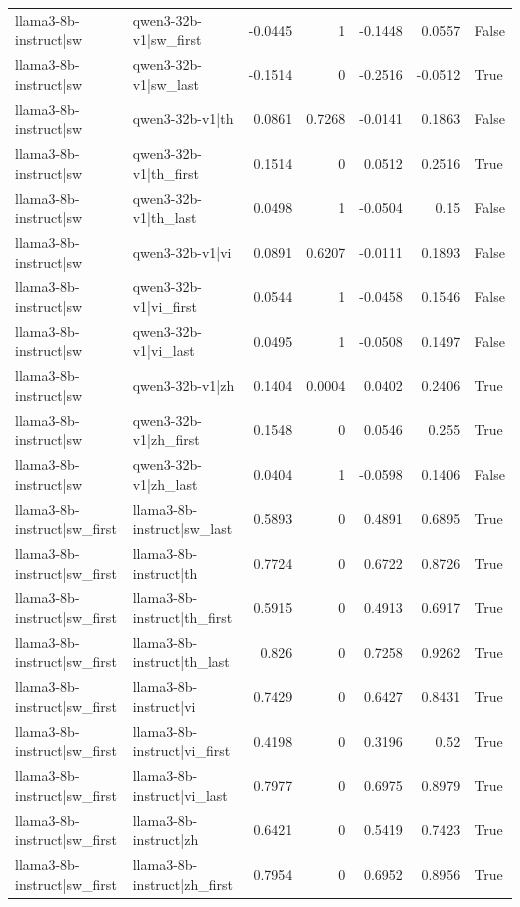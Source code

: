 \begin{table}
\begin{tabular}{l l r r r r l}
llama3-8b-instruct|sw & qwen3-32b-v1|sw_first & -0.0445 & 1 & -0.1448 & 0.0557 & False \\
llama3-8b-instruct|sw & qwen3-32b-v1|sw_last & -0.1514 & 0 & -0.2516 & -0.0512 & True \\
llama3-8b-instruct|sw & qwen3-32b-v1|th & 0.0861 & 0.7268 & -0.0141 & 0.1863 & False \\
llama3-8b-instruct|sw & qwen3-32b-v1|th_first & 0.1514 & 0 & 0.0512 & 0.2516 & True \\
llama3-8b-instruct|sw & qwen3-32b-v1|th_last & 0.0498 & 1 & -0.0504 & 0.15 & False \\
llama3-8b-instruct|sw & qwen3-32b-v1|vi & 0.0891 & 0.6207 & -0.0111 & 0.1893 & False \\
llama3-8b-instruct|sw & qwen3-32b-v1|vi_first & 0.0544 & 1 & -0.0458 & 0.1546 & False \\
llama3-8b-instruct|sw & qwen3-32b-v1|vi_last & 0.0495 & 1 & -0.0508 & 0.1497 & False \\
llama3-8b-instruct|sw & qwen3-32b-v1|zh & 0.1404 & 0.0004 & 0.0402 & 0.2406 & True \\
llama3-8b-instruct|sw & qwen3-32b-v1|zh_first & 0.1548 & 0 & 0.0546 & 0.255 & True \\
llama3-8b-instruct|sw & qwen3-32b-v1|zh_last & 0.0404 & 1 & -0.0598 & 0.1406 & False \\
llama3-8b-instruct|sw_first & llama3-8b-instruct|sw_last & 0.5893 & 0 & 0.4891 & 0.6895 & True \\
llama3-8b-instruct|sw_first & llama3-8b-instruct|th & 0.7724 & 0 & 0.6722 & 0.8726 & True \\
llama3-8b-instruct|sw_first & llama3-8b-instruct|th_first & 0.5915 & 0 & 0.4913 & 0.6917 & True \\
llama3-8b-instruct|sw_first & llama3-8b-instruct|th_last & 0.826 & 0 & 0.7258 & 0.9262 & True \\
llama3-8b-instruct|sw_first & llama3-8b-instruct|vi & 0.7429 & 0 & 0.6427 & 0.8431 & True \\
llama3-8b-instruct|sw_first & llama3-8b-instruct|vi_first & 0.4198 & 0 & 0.3196 & 0.52 & True \\
llama3-8b-instruct|sw_first & llama3-8b-instruct|vi_last & 0.7977 & 0 & 0.6975 & 0.8979 & True \\
llama3-8b-instruct|sw_first & llama3-8b-instruct|zh & 0.6421 & 0 & 0.5419 & 0.7423 & True \\
llama3-8b-instruct|sw_first & llama3-8b-instruct|zh_first & 0.7954 & 0 & 0.6952 & 0.8956 & True \\

\end{tabular}
\end{table}
